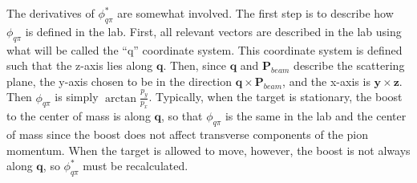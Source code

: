 The derivatives of $\phi^*_{q\pi}$ are somewhat involved.  The first step is
to describe how $\phi_{q\pi}$ is defined in the lab.  First, all relevant 
vectors are described in the lab using what will be called the ``q'' 
coordinate system.  This coordinate system is defined such that the z-axis 
lies along $\mathbf{q}$.  Then, since $\mathbf{q}$ and $\mathbf{P}_{beam}$ 
describe the scattering plane, the y-axis chosen to be in the direction 
$\mathbf{q} \times \mathbf{P}_{beam}$, and the x-axis is 
$\mathbf{y} \times \mathbf{z}$.  Then $\phi_{q\pi}$ is simply 
$\arctan{\frac{p_y}{p_x}}$.  Typically, when the target is stationary, the 
boost to the center of mass is along $\mathbf{q}$, so that $\phi_{q\pi}$ is 
the same in the lab and the center of mass since the boost does not affect 
transverse components of the pion momentum.  When the target is allowed to 
move, however, the boost is not always along $\mathbf{q}$, so $\phi^*_{q\pi}$ 
must be recalculated.

